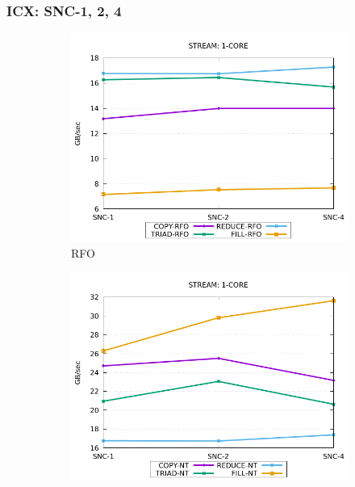 \documentclass{article}
\begin{document}
\subsubsection{ICX: SNC-1, 2, 4}

\begin{figure}[!hb]
    \centering
    \begin{subfigure}[!hb]{0.3\textwidth}
         \centering
         \includegraphics[width=\textwidth]{../data/icx-32c-snc/mem_bw_core/mb_core_rfo}
         \caption{RFO}
         \label{figure:mem_bw_core_rfo_icx_snc}
    \end{subfigure}
    \begin{subfigure}[!hb]{0.3\textwidth}
         \centering
         \includegraphics[width=\textwidth]{../data/icx-32c-snc/mem_bw_core/mb_core_nt}

\end{subfigure}
\end{figure}
\end{document}
